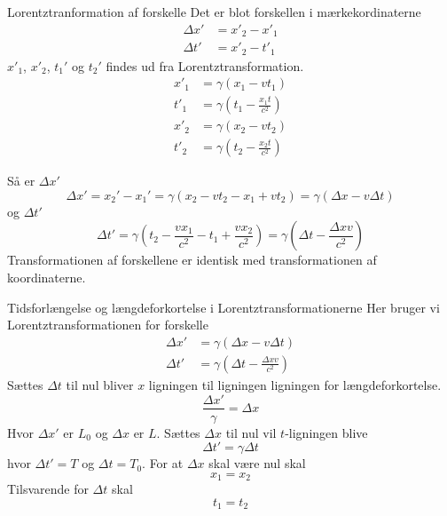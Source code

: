 \begin{opgave}{Lorentztranformation af forskelle}
    \opg Det er blot forskellen i mærkekordinaterne
    \begin{align*}
        \Delta x'&=x'_2-x'_1\\
        \Delta t' &= x'_2-t'_1
    \end{align*}
    \opg $x'_1$, $x'_2$, $t_1'$ og $t_2'$ findes ud fra Lorentztransformation.
    \begin{align*}
        x'_1&=\gamma(x_1-vt_1)\\
        t'_1&=\gamma\left(t_1-\frac{x_1t}{c^2}\right)\\
        x'_2&=\gamma(x_2-vt_2)\\
        t'_2&=\gamma\left(t_2-\frac{x_2t}{c^2}\right)
    \end{align*}
    
    Så er $\Delta x'$
    $$
    \Delta x'=x_2'-x_1'=\gamma (x_2-vt_2-x_1+vt_2)=\gamma(\Delta x-v\Delta t)
    $$
    og $\Delta t'$ 
    $$
    \Delta t'=\gamma\left(t_2-\frac{vx_1}{c^2}-t_1+\frac{vx_2}{c^2}\right)=\gamma\left(\Delta t-\frac{\Delta xv}{c^2}\right)
    $$
    Transformationen af forskellene er identisk med transformationen af koordinaterne.
\end{opgave}

\begin{opgave}{Tidsforlængelse og længdeforkortelse i Lorentztransformationerne}
    Her bruger vi Lorentztransformationen for forskelle
    \begin{align*}
        \Delta x'&=\gamma(\Delta x-v\Delta t)\\
        \Delta t'&=\gamma \left(\Delta t-\frac{\Delta xv}{c^2}\right)
    \end{align*}
    \opg Sættes $\Delta t$ til nul bliver $x$ ligningen til ligningen ligningen for længdeforkortelse.
    $$
    \frac{\Delta x'}{\gamma}=\Delta x
    $$
    Hvor $\Delta x'$ er $L_0$ og $\Delta x$ er $L$.
    \opg 
    Sættes $\Delta x$ til nul vil $t$-ligningen blive
    $$
    \Delta t'=\gamma \Delta t
    $$
    hvor $\Delta t'=T$ og $\Delta t=T_0$.
    \opg
    For at $\Delta x$ skal være nul skal
    $$
    x_1=x_2
    $$
    Tilsvarende for $\Delta t$ skal
    $$t_1=t_2$$
\end{opgave}

